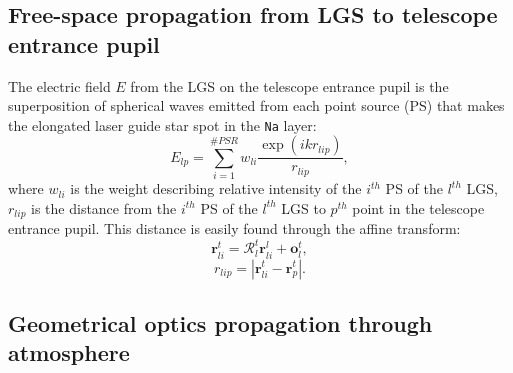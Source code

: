\subsection{Free-space propagation from LGS to telescope entrance pupil}
\label{sec:free-space-propagation}

The electric field $E$ from the LGS on the telescope entrance pupil is the
superposition of spherical waves emitted from each point source (PS) that
makes the elongated laser guide star spot in the \texttt{Na} layer:
\begin{equation} \label{eq:spherical-superposition}
	E_{lp} = \sum_{i=1}^{\#PSR} w_{li} \frac{\exp(i k r_{lip})}{r_{lip}},
\end{equation}
where $w_{li}$ is the weight describing relative intensity of the $i^{th}$ PS
of the $l^{th}$ LGS, $r_{lip}$ is the distance from the $i^{th}$ PS
of the $l^{th}$ LGS to $p^{th}$ point in the telescope entrance pupil. This
distance is easily found through the affine transform:
\begin{equation} \label{eq:source-to-pupil}
	\bm{r}_{li}^{t} = \mathcal{R}_{l}^{t} \bm{r}_{li}^{l} + \bm{o}_{l}^{t},
\end{equation}
$$ r_{lip} = |\bm{r}_{li}^{t} - \bm{r}_{p}^{t}|. $$

\subsection{Geometrical optics propagation through atmosphere}
\label{sec:geom-propagation}

